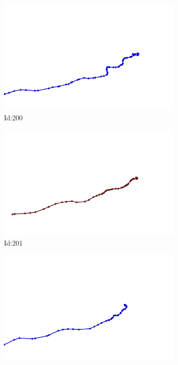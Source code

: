 \documentclass[12pt,twoside]{report}
\begin{document}
\begin{figure}
\centering
\begin{subfigure}[b]{0.20\textwidth}
\centering
\includegraphics[width=\textwidth]{../../trajectories/200.png}
\caption{Id:200}
\end{subfigure}
\begin{subfigure}[b]{0.20\textwidth}
\centering
\includegraphics[width=\textwidth]{../../trajectories/201.png}
\caption{Id:201}
\end{subfigure}
\begin{subfigure}[b]{0.20\textwidth}
\centering
\includegraphics[width=\textwidth]{../../trajectories/546.png}

\end{subfigure}
\end{figure}
\end{document}
